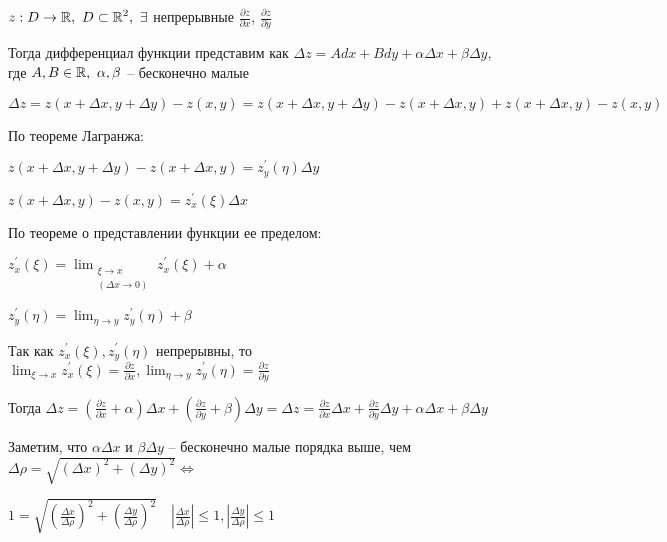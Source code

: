 \documentclass[12pt]{article}
\begin{document}
    \begin{MyTheorem}
        \Ths $\displaystyle z : D \rightarrow \mathbb{R}, \ D \subset \mathbb{R}^2, \ \exists$
        непрерывные $\displaystyle \frac{\partial z}{\partial x}$, $\displaystyle \frac{\partial z}{\partial y}$

        Тогда дифференциал функции представим как $\displaystyle \Delta z = A dx + B dy + \alpha \Delta x + \beta \Delta y$, где $\displaystyle A, B \in \mathbb{R}, \ \alpha, \beta$ -- бесконечно малые
    \end{MyTheorem}

    \begin{MyProof}
        $\displaystyle \Delta z = z (x + \Delta x, y + \Delta y) - z (x, y) = z(x + \Delta x, y + \Delta y) - z(x + \Delta x, y) +
        z(x + \Delta x, y) - z(x, y)$

        По теореме Лагранжа:

        $\displaystyle z(x + \Delta x, y + \Delta y) - z(x + \Delta x, y) = z^\prime_y(\eta) \Delta y$

        $\displaystyle z(x + \Delta x, y) - z(x, y) = z^\prime_x(\xi)\Delta x$

        По теореме о представлении функции ее пределом:

        $\displaystyle z^\prime_x(\xi) = \lim_{\substack{\xi \to x \\ (\Delta x \to 0)}} z^\prime_x(\xi) + \alpha$

        $\displaystyle z^\prime_y(\eta) = \lim_{\eta \to y} z^\prime_y(\eta) + \beta$

        Так как $\displaystyle z^\prime_x(\xi), z^\prime_y(\eta)$ непрерывны, то $\displaystyle \lim_{\xi \to x} z^\prime_x(\xi) = \frac{\partial z}{\partial x}, \lim_{\eta \to y} z^\prime_y(\eta) = \frac{\partial z}{\partial y}$

        Тогда $\displaystyle \Delta z = \left(\frac{\partial z}{\partial x} + \alpha\right) \Delta x + \left(\frac{\partial z}{\partial y} + \beta\right)\Delta y =
        \Delta z = \frac{\partial z}{\partial x}\Delta x + \frac{\partial z}{\partial y}\Delta y + \alpha \Delta x + \beta \Delta y$
    \end{MyProof}

    Заметим, что $\displaystyle \alpha \Delta x$ и $\displaystyle \beta \Delta y$ -- бесконечно малые порядка выше, чем $\displaystyle \Delta \rho = \sqrt{(\Delta x)^2 + (\Delta y)^2} \Longleftrightarrow$


    $\displaystyle 1 = \sqrt{\left(\frac{\Delta x}{\Delta \rho}\right)^2 + \left(\frac{\Delta y}{\Delta \rho}\right)^2} \quad |\frac{\Delta x}{\Delta \rho}| \leq 1, |\frac{\Delta y}{\Delta \rho}| \leq 1$
\end{document}
